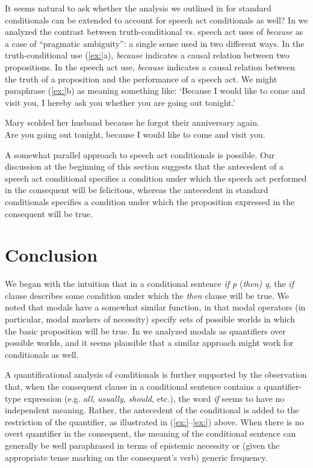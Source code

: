 It seems natural to ask whether the analysis we outlined in  for standard conditionals can be extended to account for speech act conditionals as well? In  we analyzed the contrast between truth-conditional vs. speech act uses of \textit{because} as a case of “pragmatic ambiguity”: a single sense used in two different ways. In the truth-conditional use (\ref{ex:}a), \textit{because} indicates a causal relation between two propositions. In the speech act use, \textit{because} indicates a causal relation between the truth of a proposition and the performance of a speech act. We might paraphrase (\ref{ex:}b) as meaning something like: ‘Because I would like to come and visit you, I hereby ask you whether you are going out tonight.’


\ea
\ea Mary scolded her husband because he forgot their anniversary again.\\
\ex Are you going out tonight, because I would like to come and visit you.
                       \z
\z


A somewhat parallel approach to speech act conditionals is possible. Our discussion at the beginning of this section suggests that the antecedent of a speech act conditional specifies a condition under which the speech act performed in the consequent will be felicitous, whereas the antecedent in standard conditionals specifies a condition under which the proposition expressed in the consequent will be true.


\section{Conclusion}\label{sec:19.8}

We began with the intuition that in a conditional sentence \textit{if p} (\textit{then) q}, the \textit{if} clause describes some condition under which the \textit{then} clause will be true. We noted that modals have a somewhat similar function, in that modal operators (in particular, modal markers of necessity) specify sets of possible worlds in which the basic proposition will be true. In  we analyzed modals as quantifiers over possible worlds, and it seems plausible that a similar approach might work for conditionals as well.



A quantificational analysis of conditionals is further supported by the observation that, when the consequent clause in a conditional sentence contains a quantifier-type expression (e.g. \textit{all}, \textit{usually}, \textit{should}, etc.), the word \textit{if} seems to have no independent meaning. Rather, the antecedent of the conditional is added to the restriction of the quantifier, as illustrated in (\ref{ex:}--\ref{ex:}) above. When there is no overt quantifier in the consequent, the meaning of the conditional sentence can generally be well paraphrased in terms of epistemic necessity or (given the appropriate tense marking on the consequent’s verb) generic frequency.



